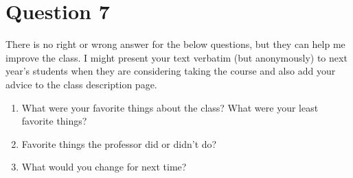 \documentclass[11pt]{article}
\begin{document}
\newpage
\section{Question 7}


There is no right or wrong answer for the below questions, but they can help me improve the class. 
I might present your text verbatim (but anonymously) to next year's students when they are considering taking the course and also add your advice to the class description page.

\begin{enumerate}
\item What were your favorite things about the class? What were your least favorite things?
\item Favorite things the professor did or didn't do?
\item What would you change for next time?
\end{enumerate}
\end{document}
